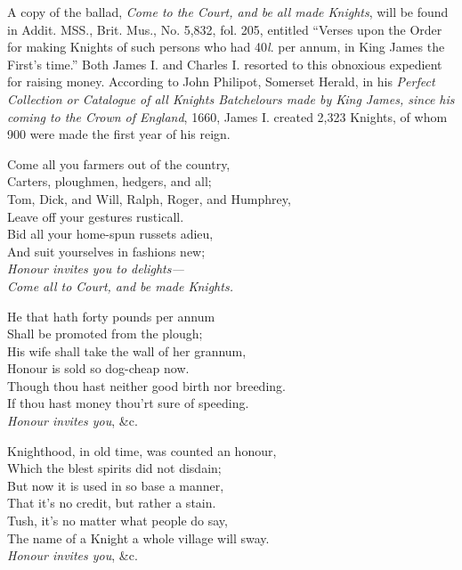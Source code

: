A copy of the ballad, \textit{Come to the Court, and be all made Knights}, will be found in
Addit. MSS., Brit. Mus., No. 5,832, fol. 205, entitled “Verses upon the Order
for making Knights of such persons who had 40\textit{l}. per annum, in King James
the First’s time.” Both James I. and Charles I. resorted to this obnoxious expedient
for raising money. According to John Philipot, Somerset Herald, in his
\textit{Perfect Collection or Catalogue of all Knights Batchelours made by King James,
since his coming to the Crown of England}, 1660, James I. created 2,323 Knights,
of whom 900 were made the first year of his reign.
\settowidth{\versewidth}{Carters, ploughmen, hedgers, and all;}
\begin{dcverse}\footnotesizerr
{}
\begin{patverse}
Come all you farmers out of the country,\\
Carters, ploughmen, hedgers, and all;\\
Tom, Dick, and Will, Ralph, Roger, and Humphrey,\\
Leave off your gestures rusticall.\\
Bid all your home-spun russets adieu,\\
And suit yourselves in fashions new;\\
\textit{Honour invites you to delights—\\
Come all to Court, and be made Knights.}
\end{patverse}

\begin{patverse}
He that hath forty pounds per annum\\
Shall be promoted from the plough;\\
His wife shall take the wall of her grannum,\\
Honour is sold so dog-cheap now.\\
Though thou hast neither good birth nor breeding.\\
If thou hast money thou’rt sure of speeding.\\
\textit{Honour invites you}, \&c.
\end{patverse}

\begin{patverse}
Knighthood, in old time, was counted an honour,\\
Which the blest spirits did not disdain;\\
But now it is used in so base a manner,\\
That it’s no credit, but rather a stain.\\
Tush, it’s no matter what people do say,\\
The name of a Knight a whole village will sway.\\
\textit{Honour invites you}, \&c.
\end{patverse}
\columnbreak


\end{dcverse}
